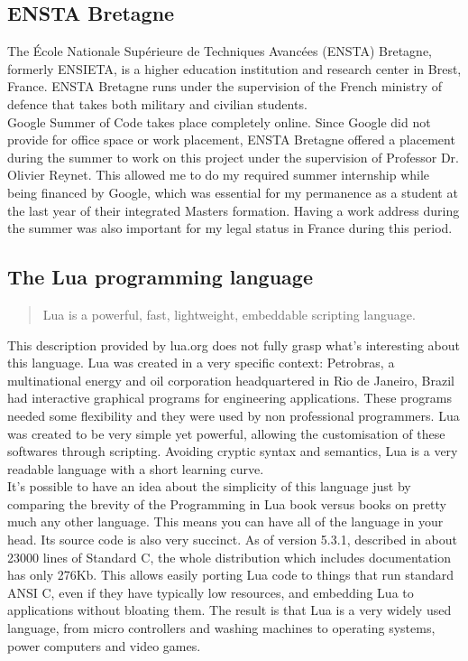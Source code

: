 \documentclass{article}
\begin{document}
\subsection{ENSTA Bretagne}

The École Nationale Supérieure de Techniques Avancées (ENSTA) Bretagne, formerly ENSIETA, is a higher education institution and research center in Brest, France. ENSTA Bretagne runs under the supervision of the French ministry of defence that takes both military and civilian students. \\

Google Summer of Code takes place completely online. Since Google did not provide for office space or work placement, ENSTA Bretagne offered a placement during the summer to work on this project under the supervision of Professor Dr. Olivier Reynet. This allowed me to do my required summer internship while being financed by Google, which was essential for my permanence as a student at the last year of their integrated Masters formation. Having a work address during the summer was also important for my legal status in France during this period.\\

\subsection{The Lua programming language}

\begin{quotation}Lua is a powerful, fast, lightweight, embeddable scripting language.\autocite{luaorg}\end{quotation}

This description provided by lua.org does not fully grasp what's interesting about this language. Lua was created in a very specific context: Petrobras, a multinational energy and oil corporation headquartered in Rio de Janeiro, Brazil had interactive graphical programs for engineering applications. These programs needed some flexibility and they were used by non professional programmers. Lua was created to be very simple yet powerful, allowing the customisation of these softwares through scripting. Avoiding cryptic syntax and semantics, Lua is a very readable language with a short learning curve. \\

It's possible to have an idea about the simplicity of this language just by comparing the brevity of the Programming in Lua book versus books on pretty much any other language. This means you can have all of the language in your head. Its source code is also very succinct. As of version 5.3.1, described in about 23000 lines of Standard C, the whole distribution which includes documentation has only 276Kb. This allows easily porting Lua code to things that run standard ANSI C, even if they have typically low resources, and embedding Lua to applications without bloating them. The result is that Lua is a very widely used language, from micro controllers and washing machines to operating systems, power computers and video games.\\
\end{document}
